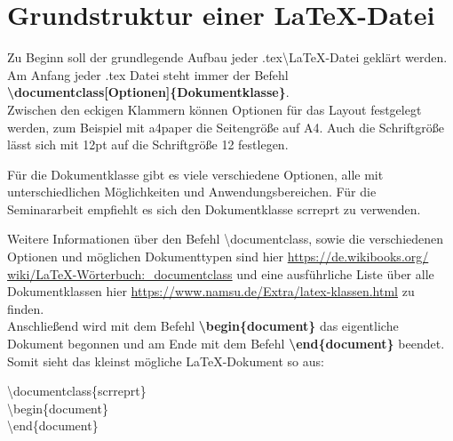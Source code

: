 \documentclass[a4paper, 12pt]{scrreprt}
\begin{document}
\section{Grundstruktur einer \LaTeX -Datei}
Zu Beginn soll der grundlegende Aufbau jeder .tex\textbackslash \LaTeX -Datei geklärt werden. Am Anfang jeder .tex Datei steht immer der Befehl\\ 
\hspace*{0.5cm}\textbf{\textbackslash documentclass[Optionen]\{Dokumentklasse\}}.\\
Zwischen den eckigen Klammern können Optionen für das Layout festgelegt werden, zum Beispiel mit a4paper die Seitengröße auf A4. Auch die Schriftgröße lässt sich mit 12pt auf die Schriftgröße 12 festlegen. 

Für die Dokumentklasse gibt es viele verschiedene Optionen, alle mit unterschiedlichen Möglichkeiten und Anwendungsbereichen. Für die Seminararbeit empfiehlt es sich den Dokumentklasse scrreprt zu verwenden.

Weitere Informationen über den Befehl \textbackslash documentclass, sowie die verschiedenen Optionen und möglichen Dokumenttypen sind hier \href{https://de.wikibooks.org/wiki/LaTeX-W\%C3\%B6rterbuch:_documentclass}{https://de.wikibooks.org/\\wiki/LaTeX-Wörterbuch:\_documentclass}  und eine ausführliche Liste über alle Dokumentklassen hier \href{https://www.namsu.de/Extra/latex-klassen.html}{https://www.namsu.de/Extra/latex-klassen.html} zu finden.\\

\noindent Anschließend wird mit dem Befehl \textbf{\textbackslash begin\{document\}} das eigentliche Dokument begonnen und am Ende mit dem Befehl \textbf{\textbackslash end\{document\}} beendet.\\
\newpage
Somit sieht das kleinst mögliche \LaTeX -Dokument so aus:\\
\begin{addmargin}{0.5cm}
\textbackslash documentclass\{scrreprt\}\\
\textbackslash begin\{document\}\\
\textbackslash end\{document\}\\
\end{addmargin}
\end{document}
